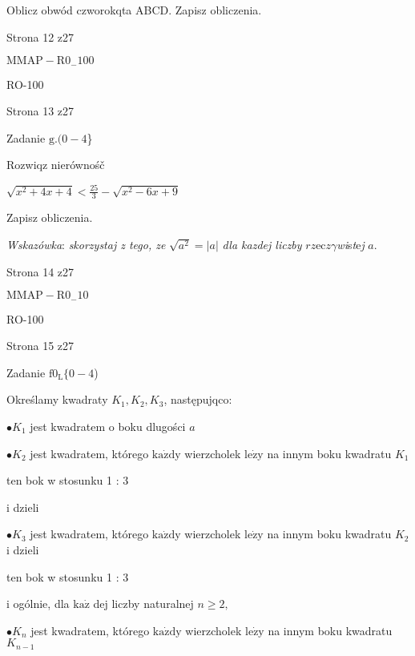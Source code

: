 \documentclass[a4paper,12pt]{article}
\begin{document}
Oblicz obwód czworokqta ABCD. Zapisz obliczenia.

Strona 12 z27

$\mathrm{M}\mathrm{M}\mathrm{A}\mathrm{P}-\mathrm{R}0_{-}100$





RO-100

Strona 13 z27





Zadanie $\mathrm{g}. (0-4$\}

Rozwiqz nierównośč

$\displaystyle \sqrt{x^{2}+4x+4}<\frac{25}{3}-\sqrt{x^{2}-6x+9}$

Zapisz obliczenia.

{\it Wskazówka}: {\it skorzystaj z tego, ze} $\sqrt{a^{2}}=|a|$ {\it dla kazdej liczby} $ rz\mathrm{e}\mathrm{c}z\gamma${\it wi}s{\it t}e{\it j} $a.$

Strona 14 z27

$\mathrm{M}\mathrm{M}\mathrm{A}\mathrm{P}-\mathrm{R}0_{-}10$





RO-100

Strona 15 z27





Zadanie $\mathrm{f}0_{\mathrm{L}}\{0-4$)

Określamy kwadraty $K_{1}, K_{2}, K_{3}$, następujqco:

$\bullet K_{1}$ jest kwadratem o boku dlugości $a$

$\bullet K_{2}$ jest kwadratem, którego $\mathrm{k}\mathrm{a}\dot{\mathrm{z}}\mathrm{d}\mathrm{y}$ wierzcholek $\mathrm{l}\mathrm{e}\dot{\mathrm{z}}\mathrm{y}$ na innym boku kwadratu $K_{1}$

ten bok w stosunku 1 : 3

i dzieli

$\bullet K_{3}$ jest kwadratem, którego $\mathrm{k}\mathrm{a}\dot{\mathrm{z}}\mathrm{d}\mathrm{y}$ wierzcholek $\mathrm{l}\mathrm{e}\dot{\mathrm{z}}\mathrm{y}$ na innym boku kwadratu $K_{2}$ i dzieli

ten bok w stosunku 1 : 3

i ogólnie, dla $\mathrm{k}\mathrm{a}\dot{\mathrm{z}}$ dej liczby naturalnej $n\geq 2,$

$\bullet K_{n}$ jest kwadratem, którego $\mathrm{k}\mathrm{a}\dot{\mathrm{z}}\mathrm{d}\mathrm{y}$ wierzcholek $\mathrm{l}\mathrm{e}\dot{\mathrm{z}}\mathrm{y}$ na innym boku kwadratu $K_{n-1}$
\end{document}
